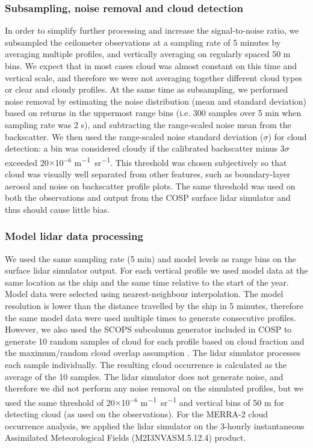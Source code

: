 \subsubsection{Subsampling, noise removal and cloud detection}
\label{sec:subsampling}

In order to simplify further processing and increase the signal-to-noise ratio,
we subsampled the ceilometer observations at a sampling rate of 5 minutes by
averaging multiple profiles, and vertically averaging on regularly spaced 50
\unit{m} bins. We expect that in most cases cloud was almost constant on this
time and vertical scale, and therefore we were not averaging together different
cloud types or clear and cloudy profiles. At the same time as subsampling, we
performed noise removal by estimating the noise distribution (mean and standard
deviation) based on returns in the uppermost range bins (i.e. 300 samples over 5
min when sampling rate was 2 \unit{s}), and subtracting the range-scaled noise
mean from the backscatter. We then used the range-scaled noise standard
deviation ($\sigma$) for cloud detection: a bin was considered cloudy if the
calibrated backscatter minus 3$\sigma$ exceeded 20$\times$10$^{-6}$ \unit{m^{-1}
sr^{-1}}. This threshold was chosen subjectively so that cloud was visually well
separated from other features, such as boundary-layer aerosol and noise on
backscatter profile plots. The same threshold was used on both the observations
and output from the COSP surface lidar simulator and thus should cause little
bias.

\subsubsection{Model lidar data processing}

We used the same sampling rate (5 min) and model levels as range bins on the
surface lidar simulator output. For each vertical profile we used model data at
the same location as the ship and the same time relative to the start of the
year. Model data were selected using nearest-neighbour interpolation. The model
resolution is lower than the distance travelled by the ship in 5 minutes,
therefore the same model data were used multiple times to generate consecutive
profiles. However, we also used the SCOPS \citep{webb2001} subcolumn generator
included in COSP to generate 10 random samples of cloud for each profile based
on cloud fraction and the maximum/random cloud overlap assumption \citep{cosp}.
The lidar simulator processes each sample individually. The resulting cloud
occurrence is calculated as the average of the 10 samples. The lidar simulator
does not generate noise, and therefore we did not perform any noise removal on
the simulated profiles, but we used the same threshold of 20$\times$10$^{-6}$
\unit{m^{-1} sr^{-1}} and vertical bins of 50 m for detecting cloud (as used on
the observations). For the MERRA-2 cloud occurrence analysis, we applied the
lidar simulator on the 3-hourly instantaneous Assimilated Meteorological Fields
(M2I3NVASM.5.12.4) product.

